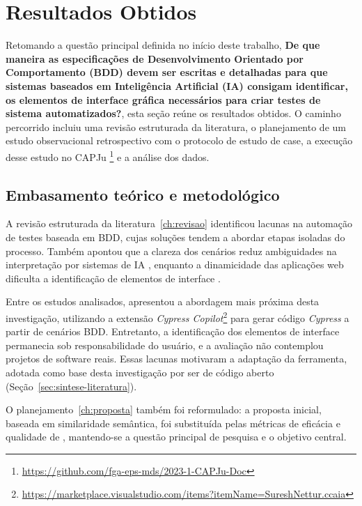 \section{Resultados Obtidos}
\label{sec:resultados-obtidos}

Retomando a questão principal definida no início deste trabalho, \textbf{De que maneira as especificações de Desenvolvimento Orientado por Comportamento (BDD) devem ser escritas e detalhadas para que sistemas baseados em Inteligência Artificial (IA) consigam identificar, os elementos de interface gráfica necessários para criar testes de sistema automatizados?}, esta seção reúne os resultados obtidos. O caminho percorrido incluiu uma revisão estruturada da literatura, o planejamento de um estudo observacional retrospectivo com o protocolo de estudo de case, a execução desse estudo no CAPJu \footnote{\url{https://github.com/fga-eps-mds/2023-1-CAPJu-Doc}} e a análise dos dados.

\subsection{Embasamento teórico e metodológico}
\label{subsec:embasamento}

A revisão estruturada da literatura~\ref{ch:revisao} identificou lacunas na automação de testes baseada em BDD, cujas soluções tendem a abordar etapas isoladas do processo. Também apontou que a clareza dos cenários reduz ambiguidades na interpretação por sistemas de IA \cite{Alinezhadtilaki2025, Ferreira2025}, enquanto a dinamicidade das aplicações web dificulta a identificação de elementos de interface \cite{Mughal2025, Pysmennyi2025}.

Entre os estudos analisados,  apresentou a abordagem mais próxima desta investigação, utilizando a extensão \textit{Cypress Copilot}\footnote{\url{https://marketplace.visualstudio.com/items?itemName=SureshNettur.ccaia}} para gerar código \textit{Cypress} a partir de cenários BDD. Entretanto, a identificação dos elementos de interface permanecia sob responsabilidade do usuário, e a avaliação não contemplou projetos de software reais. Essas lacunas motivaram a adaptação da ferramenta, adotada como base desta investigação por ser de código aberto (Seção~\ref{sec:sintese-literatura}).

O planejamento~\ref{ch:proposta} também foi reformulado: a proposta inicial, baseada em similaridade semântica, foi substituída pelas métricas de eficácia e qualidade de , mantendo-se a questão principal de pesquisa e o objetivo central.

